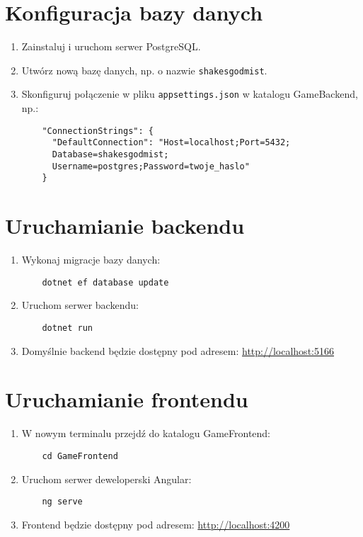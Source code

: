 \section{Konfiguracja bazy danych}
\begin{enumerate}
    \item Zainstaluj i uruchom serwer PostgreSQL.
    \item Utwórz nową bazę danych, np. o nazwie \texttt{shakesgodmist}.
    \item Skonfiguruj połączenie w pliku \texttt{appsettings.json} w katalogu GameBackend, np.:
    \begin{verbatim}
    "ConnectionStrings": {
      "DefaultConnection": "Host=localhost;Port=5432;
      Database=shakesgodmist;
      Username=postgres;Password=twoje_haslo"
    }
    \end{verbatim}
\end{enumerate}

\section{Uruchamianie backendu}
\begin{enumerate}
    \item Wykonaj migracje bazy danych:
    \begin{verbatim}
    dotnet ef database update
    \end{verbatim}
    \item Uruchom serwer backendu:
    \begin{verbatim}
    dotnet run
    \end{verbatim}
    \item Domyślnie backend będzie dostępny pod adresem: \url{http://localhost:5166}
\end{enumerate}

\section{Uruchamianie frontendu}
\begin{enumerate}
    \item W nowym terminalu przejdź do katalogu GameFrontend:
    \begin{verbatim}
    cd GameFrontend
    \end{verbatim}
    \item Uruchom serwer deweloperski Angular:
    \begin{verbatim}
    ng serve
    \end{verbatim}
    \item Frontend będzie dostępny pod adresem: \url{http://localhost:4200}
\end{enumerate}

